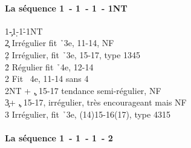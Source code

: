 \documentclass[a4paper]{article}
\begin{document}
\paragraph{La séquence 1\pdfc\ - 1\pdfd\ - 1\pdfh\ - 1NT}

\begin{bidtable}
1\c-1\d-1\h-1NT\+\\
2\c \> Irrégulier fit \h\ 3e, 11-14, NF\\
2\d \> Irrégulier, fit \h\ 3e, 15-17, type 1345\\
2\h \> Régulier fit \h\ 4e, 12-14\\
2\s \> Fit \s\ 4e, 11-14 sans 4\h \\
2NT + \c , 15-17 tendance semi-régulier, NF\\
3\c {}+ \c , 15-17, irrégulier, très encourageant mais NF\\
3\s \> Irrégulier, fit \h\ 3e, (14)15-16(17), type 4315\-
\end{bidtable}

\paragraph{La séquence 1\pdfc\ - 1\pdfd\ - 1\pdfh\ - 2\pdfc}
\end{document}
